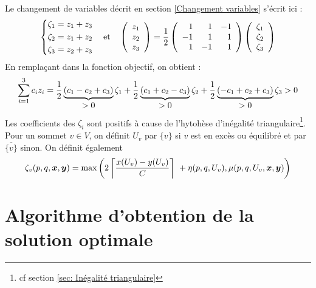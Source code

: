 \documentclass[twoside,11pt,openany,a4paper]{rapport}
\begin{document}
Le changement de variables décrit en section \ref{Changement variables} s'écrit ici :
\begin{equation}\notag
  \left\{
    \begin{aligned}
      \zeta_1 &= z_1 + z_3 \\
      \zeta_2 &= z_1 + z_2 \\
      \zeta_3 &= z_2 + z_3
    \end{aligned}
  \right.
  \quad \mbox{et} \quad
  \left(
    \begin{array}{c}
      z_1 \\
      z_2 \\
      z_3
    \end{array}
  \right)
  = \frac{1}{2}
  \left(
    \begin{array}{rrr}
      1 & 1 & -1 \\
      -1 & 1 & 1 \\
      1 & -1 & 1
    \end{array}
  \right)
  \left(
    \begin{array}{c}
      \zeta_1 \\
      \zeta_2 \\
      \zeta_3
    \end{array}
  \right)
\end{equation}
En remplaçant dans la fonction objectif, on obtient :
\begin{equation}\notag
  \sum_{i=1}^3c_iz_i =
    \frac{1}{2} \underbrace{ \left(c_1 - c_2 + c_3 \right) }_{\displaystyle >0} \zeta_1
  + \frac{1}{2} \underbrace{ \left(c_1 + c_2 - c_3 \right) }_{\displaystyle >0} \zeta_2
  + \frac{1}{2} \underbrace{ \left(-c_1 + c_2 + c_3\right) }_{\displaystyle >0} \zeta_3 >0
\end{equation}
Les coefficients des $\zeta_i$ sont positifs à cause de l'hytohèse d'inégalité triangulaire\footnote{cf section \ref{sec: Inégalité triangulaire}}.
\\

Pour un sommet $v \in V$, on définit $U_v$ par $\{v\}$ si $v$ est en excès ou équilibré et par $\overline{\{v\}}$ sinon. On définit également
\[
\zeta_v(p,q,\boldsymbol{x},\boldsymbol{y}) = \mbox{max} \left( 2 \left\lceil \frac{x(U_v)-y(U_v)}{C} \right\rceil\ + \eta(p,q,U_v), \mu(p,q,U_v,\boldsymbol{x},\boldsymbol{y}) \right)
\]

\section{Algorithme d'obtention de la solution optimale}
\end{document}
